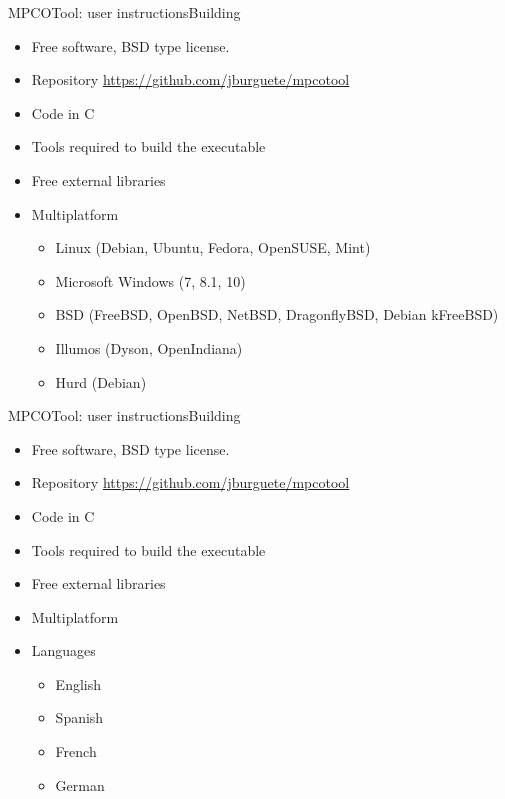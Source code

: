 \documentclass[10pt]{beamer}
\begin{document}
\begin{frame}{MPCOTool: user instructions}{Building}
	\begin{itemize}
		\item Free software, BSD type license.
		\item Repository \url{https://github.com/jburguete/mpcotool}
		\item Code in C
		\item Tools required to build the executable
		\item Free external libraries
		\item Multiplatform
		\begin{itemize}
			\item Linux (Debian, Ubuntu, Fedora, OpenSUSE, Mint)
			\item Microsoft Windows (7, 8.1, 10)
			\item BSD (FreeBSD, OpenBSD, NetBSD, DragonflyBSD, Debian kFreeBSD)
			\item Illumos (Dyson, OpenIndiana)
			\item Hurd (Debian)
		\end{itemize}
	\end{itemize}
\end{frame}

\begin{frame}{MPCOTool: user instructions}{Building}
	\begin{itemize}
		\item Free software, BSD type license.
		\item Repository \url{https://github.com/jburguete/mpcotool}
		\item Code in C
		\item Tools required to build the executable
		\item Free external libraries
		\item Multiplatform
		\item Languages
		\begin{itemize}
			\item English
			\item Spanish
			\item French
			\item German
		\end{itemize}
	\end{itemize}
\end{frame}
\end{document}
